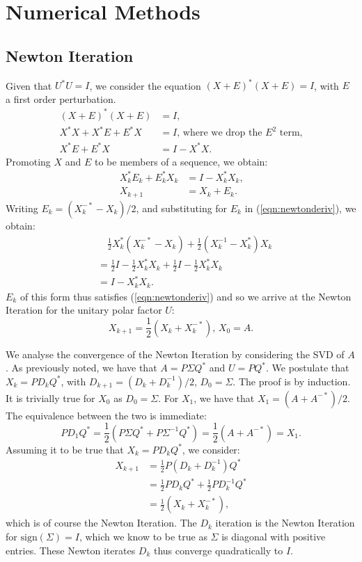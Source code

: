\documentclass[12pt]{article}
\begin{document}
\section{Numerical Methods}
\subsection{Newton Iteration}
Given that $U^*U = I$, we consider the equation $(X+E)^*(X+E) = I$, with $E$ a
first order perturbation.
\begin{align*}
  (X+E)^*(X+E) & = I\text{, } \\
  X^*X + X^*E + E^*X & = I\text{, where we drop the } E^2 \text{ term,} \\
  X^*E + E^*X &  = I - X^*X\text{.} 
\end{align*}
Promoting $X$ and $E$ to be members of a sequence, we obtain:
\begin{align}\label{eqn:newtonderiv}
    X_k^*E_k + E_k^*X_k & = I - X_k^*X_k\text{,} \\
    X_{k+1} & = X_k + E_k\text{.}
\end{align}
Writing $E_k = (X_k^{-*} - X_k)/2$, and substituting for
$E_k$ in (\ref{eqn:newtonderiv}), we obtain:
\begin{align*}
  &\quad\frac{1}{2}X_k^*(X_k^{-*} - X_k) + \frac{1}{2}(X_k^{-1} - X_k^*)X_k \\
  &= \frac{1}{2}I - \frac{1}{2} X_k^*X_k + \frac{1}{2}I -  \frac{1}{2} X_k^*X_k  \\
  &= I - X_k^*X_k\text{.}
\end{align*}
$E_k$ of this form thus satisfies (\ref{eqn:newtonderiv}) and so we arrive
at the Newton Iteration for the unitary polar factor $U$:
\begin{equation}\label{eqn:newton}
  X_{k+1} = \frac{1}{2}(X_k + X_{k}^{-*})\text{, } X_0 = A\text{.}
\end{equation}

We analyse the convergence of the Newton Iteration by considering the SVD of $A$.
As previously noted, we have that $A=P\Sigma Q^*$ and $U=PQ^*$.
We postulate that $X_k = PD_kQ^*$, with $D_{k+1} = (D_k + D_k^{-1})/2$, $D_0 = \Sigma$.
The proof is by induction.
It is trivially true for $X_0$ as $D_0 = \Sigma$.
For $X_1$, we have that $X_1 = (A + A^{-*})/2$.
The equivalence between the two is immediate:
\begin{equation*}
  PD_1Q^* = \frac{1}{2}(P\Sigma Q^* + P\Sigma^{-1} Q^*) = \frac{1}{2}(A + A^{-*}) = X_1\text{.}
\end{equation*}
Assuming it to be true that $X_k = PD_kQ^*$, we consider:
\begin{align*}
  X_{k+1} & = \frac{1}{2}P(D_k + D_k^{-1})Q^* \\
          & = \frac{1}{2}PD_kQ^* + \frac{1}{2}PD_k^{-1}Q^* \\
          & = \frac{1}{2}(X_k + X_k^{-*})\text{, }
\end{align*}
which is of course the Newton Iteration. The $D_k$ iteration is the Newton
Iteration for $\mathrm{sign}(\Sigma) = I$, which we know to be true as $\Sigma$
is diagonal with positive entries. These Newton iterates $D_k$ thus converge
quadratically to $I$\cite{Higham:2008:FM}.
\end{document}
